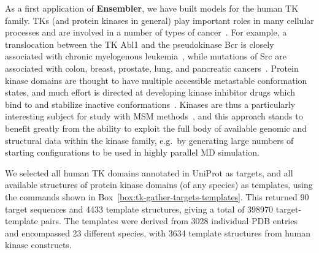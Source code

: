 \documentclass[aps,pre,twocolumn,nofootinbib,superscriptaddress,linenumbers]{revtex4-1}
\begin{document}
As a first application of {\bf Ensembler}, we have built models for the human TK family.
TKs (and protein kinases in general) play important roles in many cellular processes and are involved in a number of types of cancer~\cite{krause:nejm:2005:tks-cancer}.
For example, a translocation between the TK Abl1 and the pseudokinase Bcr is closely associated with chronic myelogenous leukemia~\cite{greuber:2013:abl-cancer-review}, while mutations of Src are associated with colon, breast, prostate, lung, and pancreatic cancers~\cite{kim:2009:src-cancer-review}.
Protein kinase domains are thought to have multiple accessible metastable conformation states, and much effort is directed at developing kinase inhibitor drugs which bind to and stabilize inactive conformations~\cite{liu:ncb:2006:kinase-inhibitors-inactive-conformations}.
Kinases are thus a particularly interesting subject for study with MSM methods~\cite{shukla-pande:nature-commun:2014:src-activation-msm}, and this approach stands to benefit greatly from the ability to exploit the full body of available genomic and structural data within the kinase family, e.g.~by generating large numbers of starting configurations to be used in highly parallel MD simulation.

We selected all human TK domains annotated in UniProt as targets, and all available structures of protein kinase domains (of any species) as templates, using the commands shown in Box~\ref{box:tk-gather-targets-templates}.
This returned 90 target sequences and 4433 template structures, giving a total of \num{398970} target-template pairs.
The templates were derived from 3028 individual PDB entries and encompassed 23 different species, with 3634 template structures from human kinase constructs.
\end{document}
